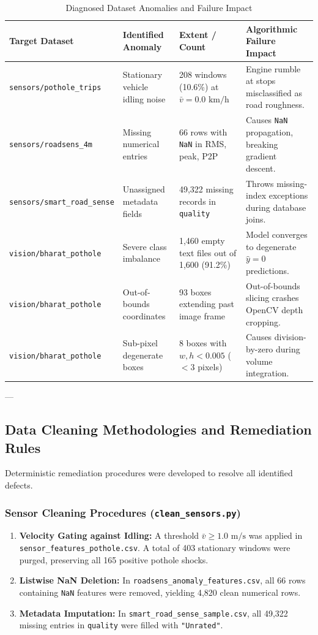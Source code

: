 \begin{table}[htbp]
\centering
\small
\caption{Diagnosed Dataset Anomalies and Failure Impact}
\label{tab:diagnosed_anomalies}
\begin{tabularx}{\textwidth}{p{3.4cm}p{3.8cm}p{3.8cm}X}
\toprule
\textbf{Target Dataset} & \textbf{Identified Anomaly} & \textbf{Extent / Count} & \textbf{Algorithmic Failure Impact} \\
\midrule
\texttt{sensors/pothole\_trips} & Stationary vehicle idling noise & 208 windows (10.6\%) at $\bar{v} = 0.0\text{ km/h}$ & Engine rumble at stops misclassified as road roughness. \\
\texttt{sensors/roadsens\_4m} & Missing numerical entries & 66 rows with \texttt{NaN} in RMS, peak, P2P & Causes \texttt{NaN} propagation, breaking gradient descent. \\
\texttt{sensors/smart\_road\_sense} & Unassigned metadata fields & 49,322 missing records in \texttt{quality} & Throws missing-index exceptions during database joins. \\
\texttt{vision/bharat\_pothole} & Severe class imbalance & 1,460 empty text files out of 1,600 (91.2\%) & Model converges to degenerate $\hat{y} = 0$ predictions. \\
\texttt{vision/bharat\_pothole} & Out-of-bounds coordinates & 93 boxes extending past image frame & Out-of-bounds slicing crashes OpenCV depth cropping. \\
\texttt{vision/bharat\_pothole} & Sub-pixel degenerate boxes & 8 boxes with $w, h < 0.005$ ($<3$ pixels) & Causes division-by-zero during volume integration. \\
\bottomrule
\end{tabularx}
\end{table}

---

\subsection{Data Cleaning Methodologies and Remediation Rules}
Deterministic remediation procedures were developed to resolve all identified defects.

\subsubsection{Sensor Cleaning Procedures (\texttt{clean\_sensors.py})}
\begin{enumerate}
    \item \textbf{Velocity Gating against Idling:} A threshold $\bar{v} \ge 1.0\text{ m/s}$ was applied in \texttt{sensor\_features\_pothole.csv}. A total of 403 stationary windows were purged, preserving all 165 positive pothole shocks.
    \item \textbf{Listwise NaN Deletion:} In \texttt{roadsens\_anomaly\_features.csv}, all 66 rows containing \texttt{NaN} features were removed, yielding 4,820 clean numerical rows.
    \item \textbf{Metadata Imputation:} In \texttt{smart\_road\_sense\_sample.csv}, all 49,322 missing entries in \texttt{quality} were filled with \texttt{"Unrated"}.
\end{enumerate}

